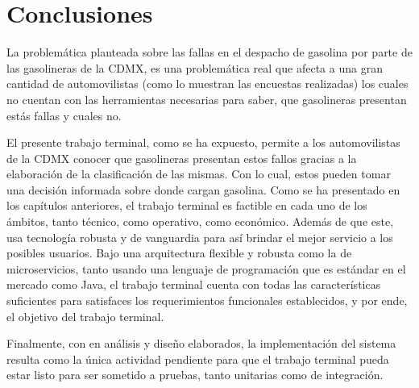 \chapter{Conclusiones}\label{chapter5}
La problemática planteada sobre las fallas en el despacho de gasolina por parte de las gasolineras de la CDMX, es una problemática real que afecta a una gran cantidad de automovilistas (como lo muestran las encuestas realizadas) los cuales no cuentan con las herramientas necesarias para saber, que gasolineras presentan estás fallas y cuales no. 

El presente trabajo terminal, como se ha expuesto, permite a los automovilistas de la CDMX conocer que gasolineras presentan estos fallos gracias a la elaboración de la clasificación de las mismas. Con lo cual, estos pueden tomar una decisión informada sobre donde cargan gasolina. Como se ha presentado en los capítulos anteriores, el trabajo terminal es factible en cada uno de los ámbitos, tanto técnico, como operativo, como económico. Además de que este, usa tecnología robusta y de vanguardia para así brindar el mejor servicio a los posibles usuarios. Bajo una arquitectura flexible y robusta como la de microservicios, tanto usando una lenguaje de programación que es estándar en el mercado como Java, el trabajo terminal cuenta con todas las características suficientes para satisfaces los requerimientos funcionales establecidos, y por ende, el objetivo del trabajo terminal.

Finalmente, con en análisis y diseño elaborados, la implementación del sistema resulta como la única actividad pendiente para que el trabajo terminal pueda estar listo para ser sometido a pruebas, tanto unitarias como de integración.
